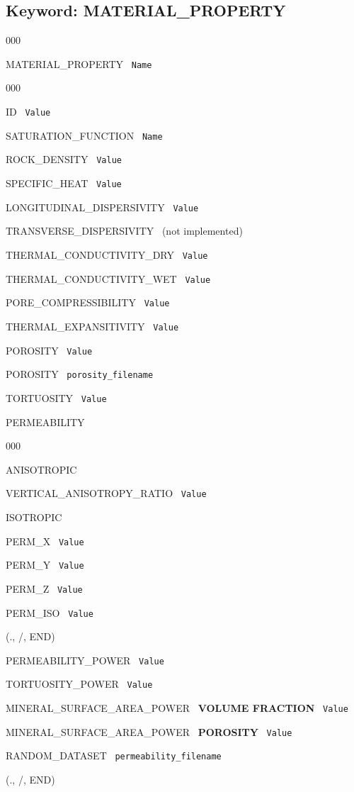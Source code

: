 \documentclass[12pt]{article}
\begin{document}



\newpage
\protect\hypertarget{target_mat}{}

\subsection{Keyword: MATERIAL\_PROPERTY}


\begin{deflist}{000}
\item[MATERIAL\_PROPERTY] \ {\tt Name}
\begin{deflist}{000}
\item[ID] \ {\tt Value}
\item[SATURATION\_FUNCTION] \ {\tt Name}
\item[ROCK\_DENSITY] \ {\tt Value}
\item[SPECIFIC\_HEAT] \ {\tt Value}
\item[LONGITUDINAL\_DISPERSIVITY] \ {\tt Value}
\item[TRANSVERSE\_DISPERSIVITY] \ (not implemented)
\item[THERMAL\_CONDUCTIVITY\_DRY] \ {\tt Value}
\item[THERMAL\_CONDUCTIVITY\_WET] \ {\tt Value}
\item[PORE\_COMPRESSIBILITY] \ {\tt Value}
\item[THERMAL\_EXPANSITIVITY] \ {\tt Value}
\item[POROSITY] \ {\tt Value}
\item[POROSITY] \ {\tt porosity\_filename}
\item[TORTUOSITY] \ {\tt Value}
\item[PERMEABILITY] ~
\begin{deflist}{000}
\item[ANISOTROPIC]
\item[VERTICAL\_ANISOTROPY\_RATIO] \ {\tt Value}
\item[ISOTROPIC]
\item[PERM\_X] \ {\tt Value}
\item[PERM\_Y] \ {\tt Value}
\item[PERM\_Z] \ {\tt Value}
\item[PERM\_ISO] \ {\tt Value}
\end{deflist}
\item[(., /, END)]
\item[PERMEABILITY\_POWER] \ {\tt Value}
\item[TORTUOSITY\_POWER] \ {\tt Value}
\item[MINERAL\_SURFACE\_AREA\_POWER] \ {\bf VOLUME FRACTION} \ {\tt Value}
\item[MINERAL\_SURFACE\_AREA\_POWER] \ {\bf POROSITY} \ {\tt Value}
\item[RANDOM\_DATASET] \ {\tt permeability\_filename}
\end{deflist}
\item[(., /, END)]
\end{deflist}
\end{document}

